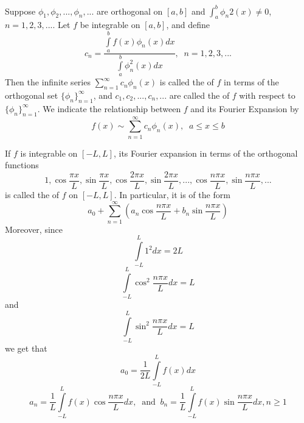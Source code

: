 \documentclass[12pt, a4paper, oneside, openright, titlepage]{book}
\begin{document}
\begin{defn}
        Suppose $\phi_1,\phi_2,...,\phi_n,...$ are orthogonal on $[a,b]$ and $\int_a^b\phi_n2(x)\neq 0$, $n=1,2,3,...$. Let $f$ be integrable on $[a,b]$, and define \begin{equation}
                c_n = \frac{\int\limits_a^bf(x)\phi_n(x)dx}{\int\limits_a^b\phi_n^2(x)dx},\;\;n=1,2,3,...
        \end{equation}
        Then the infinite series $\sum_{n=1}^{\infty}c_n\phi_n(x)$ is called the  of $f$ in terms of the orthogonal set $\{\phi_n\}_{n=1}^{\infty}$, and $c_1,c_2,...,c_n,...$ are called the  of $f$ with respect to $\{\phi_n\}_{n=1}^{\infty}$. We indicate the relationship between $f$ and its Fourier Expansion by \begin{equation}
                f(x) \sim \sum\limits_{n=1}^{\infty}c_n\phi_n(x),\;\;a\leq x\leq b
        \end{equation}
\end{defn}




\begin{defn}
        If $f$ is integrable on $[-L,L]$, its Fourier expansion in terms of the orthogonal functions \begin{equation}
                1, \cos\frac{\pi x}{L}, \sin\frac{\pi x}{L},\cos\frac{2\pi x}{L},\sin\frac{2\pi x}{L},...,\cos\frac{n\pi x}{L},\sin\frac{n\pi x}{L},...
        \end{equation}
        is called the  of $f$ on $[-L,L]$. In particular, it is of the form \begin{equation}
                a_0 + \sum\limits_{n=1}^{\infty}\left(a_n\cos\frac{n\pi x}{L}+b_n\sin\frac{n\pi x}{L}\right)
        \end{equation}
        Moreover, since \begin{equation*}
                \int\limits_{-L}^L1^2dx = 2L
        \end{equation*}
        \begin{equation*}
                \int\limits_{-L}^L\cos^2\frac{n\pi x}{L}dx = L
        \end{equation*}
        and \begin{equation*}
                \int\limits_{-L}^L\sin^2\frac{n\pi x}{L}dx = L
        \end{equation*}
        we get that \begin{equation}
                a_0 = \frac{1}{2L}\int\limits_{-L}^Lf(x)dx
        \end{equation}
        \begin{equation}
                a_n = \frac{1}{L}\int\limits_{-L}^Lf(x)\cos\frac{n\pi x}{L}dx,\;\;\text{and}\;\;b_n = \frac{1}{L}\int\limits_{-L}^Lf(x)\sin\frac{n\pi x}{L}dx, n \geq 1
        \end{equation}
\end{defn}
\end{document}
